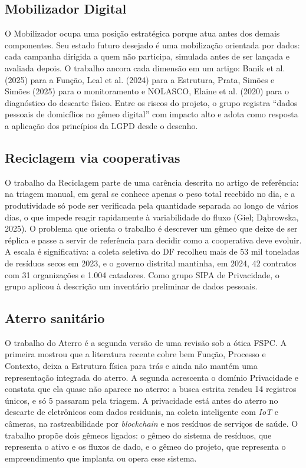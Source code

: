 \documentclass[12pt,a4paper,article,oneside,english,brazil]{abntex2}
\begin{document}
\subsection{Mobilizador Digital}

O Mobilizador ocupa uma posição estratégica porque atua antes dos demais componentes. Seu estado futuro desejado é uma mobilização orientada por dados: cada campanha dirigida a quem não participa, simulada antes de ser lançada e avaliada depois. O trabalho ancora cada dimensão em um artigo: Banik et al. (2025) para a Função, Leal et al. (2024) para a Estrutura, Prata, Simões e Simões (2025) para o monitoramento e NOLASCO, Elaine et al. (2020) para o diagnóstico do descarte físico. Entre os riscos do projeto, o grupo registra ``dados pessoais de domicílios no gêmeo digital'' com impacto alto e adota como resposta a aplicação dos princípios da LGPD desde o desenho.

\subsection{Reciclagem via cooperativas}

O trabalho da Reciclagem parte de uma carência descrita no artigo de referência: na triagem manual, em geral se conhece apenas o peso total recebido no dia, e a produtividade só pode ser verificada pela quantidade separada ao longo de vários dias, o que impede reagir rapidamente à variabilidade do fluxo (Giel; Dąbrowska, 2025). O problema que orienta o trabalho é descrever um gêmeo que deixe de ser réplica e passe a servir de referência para decidir como a cooperativa deve evoluir. A escala é significativa: a coleta seletiva do DF recolheu mais de 53 mil toneladas de resíduos secos em 2023, e o governo distrital mantinha, em 2024, 42 contratos com 31 organizações e 1.004 catadores. Como grupo SIPA de Privacidade, o grupo aplicou à descrição um inventário preliminar de dados pessoais.

\subsection{Aterro sanitário}

O trabalho do Aterro é a segunda versão de uma revisão sob a ótica FSPC. A primeira mostrou que a literatura recente cobre bem Função, Processo e Contexto, deixa a Estrutura física para trás e ainda não mantém uma representação integrada do aterro. A segunda acrescenta o domínio Privacidade e constata que ela quase não aparece no aterro: a busca estrita rendeu 14 registros únicos, e só 5 passaram pela triagem. A privacidade está antes do aterro no descarte de eletrônicos com dados residuais, na coleta inteligente com \textit{IoT} e câmeras, na rastreabilidade por \textit{blockchain} e nos resíduos de serviços de saúde. O trabalho propõe dois gêmeos ligados: o gêmeo do sistema de resíduos, que representa o ativo e os fluxos de dado, e o gêmeo do projeto, que representa o empreendimento que implanta ou opera esse sistema.
\end{document}
